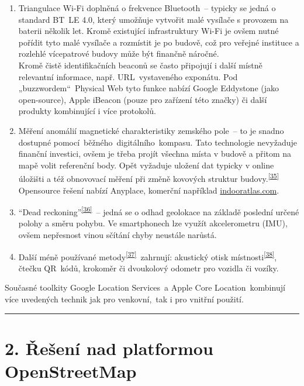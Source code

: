 \begin{enumerate}
\tightlist
\item
  Triangulace Wi-Fi doplněná o frekvence Bluetooth~-- typicky se jedná o standard BT~LE 4.0, který umožňuje vytvořit malé vysílače s provozem na baterii několik let. Kromě existující infrastruktury Wi-Fi je ovšem nutné pořídit tyto malé vysílače a rozmístit je po budově, což pro veřejné instituce a rozlehlé vícepatrové budovy může být finančně náročné.\\[2\baselineskip]Kromě čistě identifikačních beaconů se často připojují i další místně relevantní informace, např. URL~vystaveného exponátu. Pod „buzzwordem``~Physical Web tyto funkce nabízí Google Eddystone (jako open-source), Apple iBeacon (pouze pro zařízení této značky) či další produkty kombinující i více protokolů.
\item
  Měření anomálií magnetické charakteristiky zemského pole~-- to je snadno dostupné pomocí~běžného~digitálního~kompasu. Tato technologie nevyžaduje finanční investici, ovšem je třeba projít všechna místa v budově a přitom na mapě volit referenční body. Opět vyžaduje uložení dat typicky v online úložišti a též obnovovací měření při změně kovových struktur budovy.\textsuperscript{\href{}{{[}35{]}}}\\[2\baselineskip]Opensource řešení nabízí Anyplace, komerční například \href{}{indooratlas.com}.
\item
  ``Dead reckoning''\textsuperscript{\href{}{{[}36{]}}}~-- jedná se o odhad geolokace na základě poslední určené polohy a směru pohybu. Ve smartphonech lze využít akcelerometru (IMU), ovšem nepřesnost vinou sčítání chyby neustále narůstá.
\item
  Další méně používané metody\textsuperscript{\href{}{{[}37{]}}}~zahrnují: akustický otisk místnosti\textsuperscript{\href{}{{[}38{]}}}, čtečku QR~kódů, krokoměr či dvoukolový odometr pro vozidla či vozíky.
\end{enumerate}

Současné toolkity Google Location Services~a Apple Core Location~kombinují více uvedených technik jak pro venkovní,~tak i pro vnitřní použití.

\begin{center}\rule{0.5\linewidth}{\linethickness}\end{center}

\chapter{2. Řešení nad platformou OpenStreetMap}\label{ux159eux161enuxed-nad-platformou-openstreetmap}

